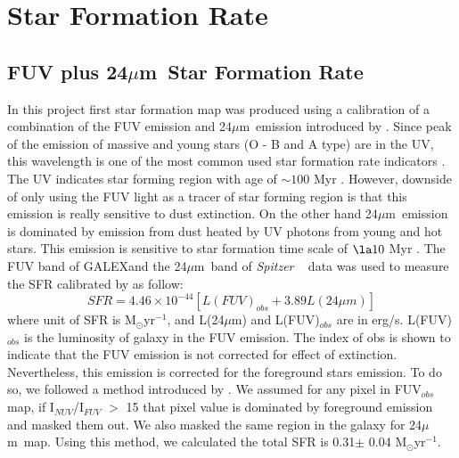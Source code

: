 \documentclass[useAMS,usenatbib]{mn2e}
\newcommand \um    {$\mu$m\ }
\newcommand \Spitzer {{\it Spitzer }}
\newcommand \Galex {GALEX}
\begin{document}
\section{Star Formation Rate}
\subsection{FUV plus 24\um Star Formation Rate}

In this project first star formation map was produced using a calibration of a combination of the FUV emission and 24\um emission introduced by \cite{Hao11}. Since peak of the emission of massive and young stars (O - B and A type) are in the UV, this wavelength is one of the most common used star formation rate indicators \citep[e.g.,][]{Kennicutt89}. The UV indicates star forming region with age of $\sim 100$ Myr \citep[e.g.,][]{Kennicutt98a, Calzetti05}. However, downside of only using the FUV light as a tracer of star forming region is that this emission is really sensitive to dust extinction. On the other hand 24\um emission is dominated by emission from dust heated by UV photons from young and hot stars. This emission is sensitive to star formation time scale of $\la10$ Myr \citep{Calzetti07}.
The FUV band of \Galex and the 24\um band of \Spitzer ~ data was used to measure the SFR calibrated by \cite{Hao11} as follow:
\begin{equation}
\label{equ: fuvplus24}
SFR =4.46\times10^{-44}[L(FUV)_{obs}+3.89L(24\mu m)]
\end{equation}
where unit of SFR is M$_{\odot}$yr$^{-1}$, and L(24$\mu$m) and L(FUV)$_{obs}$ are in erg/s. L(FUV)$_{obs}$ is the luminosity of galaxy in the FUV emission. The index of obs is shown to indicate that the FUV emission is not corrected for effect of extinction. Nevertheless, this emission is corrected for the foreground stars emission. To do so, we followed a method introduced by \cite{Leroy08}. We assumed for any pixel in FUV$_{obs}$ map, %
if I$_{NUV}$/I$_{FUV}$ $>$ 15 that pixel value is dominated by foreground emission and masked them out. We also masked the same region in the galaxy for 24\um map. Using this method, we calculated the total SFR is 0.31$\pm$ 0.04 M$_{\odot}$yr$^{-1}$.
\end{document}
